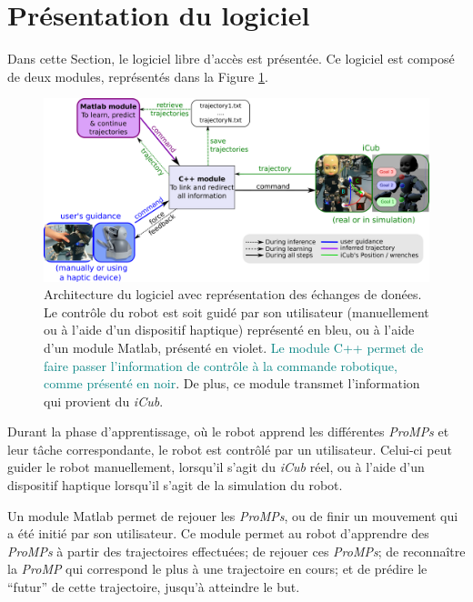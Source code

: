 \documentclass[utf8]{frontiersSCNS} %
\newcommand{\toimprove}[1]{\textcolor{teal}{#1}}
\newcommand{\todo}[1]{\textcolor{red}{\textbf{/*#1*/}}}
\begin{document}
\section{Présentation du logiciel}\label{sec:softwareOverview}

Dans cette Section, le logiciel libre d'accès est présentée. Ce logiciel est composé de deux modules, représentés dans la Figure \ref{fig:orgaSoftware}.

\label{sec:software}
\begin{figure}[h]
\center
\includegraphics[width=\hsize]{img/liaisonAllProgramV3.pdf}
\caption{Architecture du logiciel avec représentation des échanges de donées.\\ Le contrôle du robot est soit guidé par son utilisateur (manuellement ou à l'aide d'un dispositif haptique) représenté en bleu, ou à l'aide d'un module Matlab, présenté en violet. \toimprove{Le module  C++ permet de faire passer l'information de contrôle à la commande robotique, comme présenté en noir}. De plus, ce module transmet l'information qui provient du \textit{iCub}.}
\label{fig:orgaSoftware}
\end{figure}

Durant la phase d'apprentissage, où le robot apprend les différentes \textit{ProMPs} et leur tâche correspondante, le robot est contrôlé par un utilisateur. Celui-ci peut guider le robot manuellement, lorsqu'il s'agit du \textit{iCub} réel, ou à l'aide d'un dispositif haptique lorsqu'il s'agit de la simulation du robot.

Un module Matlab permet de rejouer les \textit{ProMPs}, ou de finir un mouvement qui a été initié par son utilisateur. Ce module permet au robot d'apprendre des \textit{ProMPs} à partir des trajectoires effectuées; de rejouer ces \textit{ProMPs}; de reconnaître la \textit{ProMP} qui correspond le plus à une trajectoire en cours; et de prédire le ``futur'' de cette trajectoire, jusqu'à atteindre le but.
\end{document}
